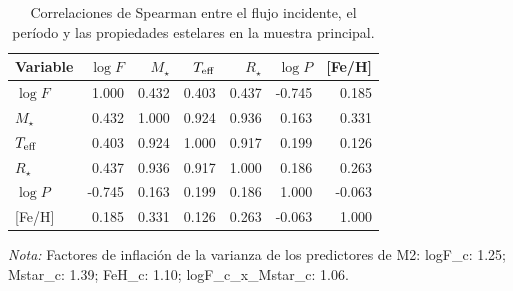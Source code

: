 \begin{table}[htbp]
    \centering
    \caption{Correlaciones de Spearman entre el flujo incidente, el período y las propiedades estelares en la muestra principal.}
    \label{tab:Z-T13}
    \small
    \begin{tabular}{lrrrrrr}
    \toprule
    Variable & $\log F$ & $M_\star$ & $T_{\rm eff}$ & $R_\star$ & $\log P$ & {[Fe/H]} \\
    \midrule
    $\log F$ & 1.000 & 0.432 & 0.403 & 0.437 & -0.745 & 0.185 \\
    $M_\star$ & 0.432 & 1.000 & 0.924 & 0.936 & 0.163 & 0.331 \\
    $T_{\rm eff}$ & 0.403 & 0.924 & 1.000 & 0.917 & 0.199 & 0.126 \\
    $R_\star$ & 0.437 & 0.936 & 0.917 & 1.000 & 0.186 & 0.263 \\
    $\log P$ & -0.745 & 0.163 & 0.199 & 0.186 & 1.000 & -0.063 \\
    {[Fe/H]} & 0.185 & 0.331 & 0.126 & 0.263 & -0.063 & 1.000 \\
    \bottomrule
    \end{tabular}
    \par\smallskip
    {\footnotesize\textit{Nota:} Factores de inflación de la varianza de los predictores de M2: logF\_c: 1.25; Mstar\_c: 1.39; FeH\_c: 1.10; logF\_c\_x\_Mstar\_c: 1.06.}
\end{table}
